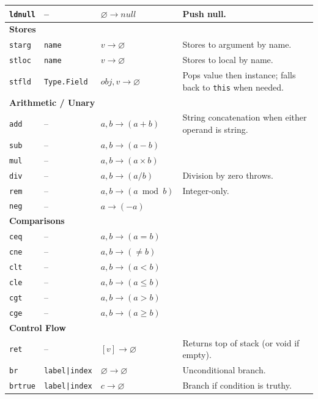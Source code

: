 \documentclass[11pt,a4paper]{article}
\begin{document}
\begin{longtable}{|l|l|l|p{6.5cm}|}
				\texttt{ldnull} & -- & $\varnothing \rightarrow null$ & Push null. \\
		\hline
		\multicolumn{4}{|l|}{\textbf{Stores}} \\
		\hline
				\texttt{starg} & \texttt{name} & $v \rightarrow \varnothing$ & Stores to argument by name. \\
				\texttt{stloc} & \texttt{name} & $v \rightarrow \varnothing$ & Stores to local by name. \\
				\texttt{stfld} & \texttt{Type.Field} & $obj, v \rightarrow \varnothing$ & Pops value then instance; falls back to \texttt{this} when needed. \\
		\hline
		\multicolumn{4}{|l|}{\textbf{Arithmetic / Unary}} \\
		\hline
				\texttt{add} & -- & $a, b \rightarrow (a + b)$ & String concatenation when either operand is string. \\
				\texttt{sub} & -- & $a, b \rightarrow (a - b)$ &  \\
				\texttt{mul} & -- & $a, b \rightarrow (a \times b)$ &  \\
				\texttt{div} & -- & $a, b \rightarrow (a / b)$ & Division by zero throws. \\
				\texttt{rem} & -- & $a, b \rightarrow (a \bmod b)$ & Integer-only. \\
				\texttt{neg} & -- & $a \rightarrow (-a)$ &  \\
		\hline
		\multicolumn{4}{|l|}{\textbf{Comparisons}} \\
		\hline
				\texttt{ceq} & -- & $a, b \rightarrow (a = b)$ &  \\
				\texttt{cne} & -- & $a, b \rightarrow ( \neq b)$ &  \\
				\texttt{clt} & -- & $a, b \rightarrow (a < b)$ &  \\
				\texttt{cle} & -- & $a, b \rightarrow (a \le b)$ &  \\
				\texttt{cgt} & -- & $a, b \rightarrow (a > b)$ &  \\
				\texttt{cge} & -- & $a, b \rightarrow (a \ge b)$ &  \\
		\hline
		\multicolumn{4}{|l|}{\textbf{Control Flow}} \\
		\hline
				\texttt{ret} & -- & $[v] \rightarrow \varnothing$ & Returns top of stack (or void if empty). \\
				\texttt{br} & \texttt{label|index} & $\varnothing \rightarrow \varnothing$ & Unconditional branch. \\
				\texttt{brtrue} & \texttt{label|index} & $c \rightarrow \varnothing$ & Branch if condition is truthy. \\

\end{longtable}
\end{document}
